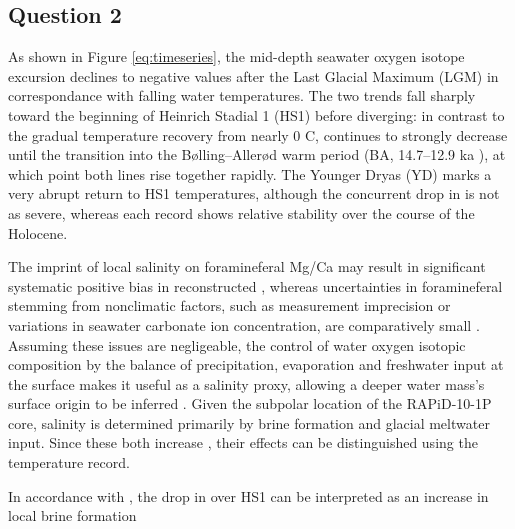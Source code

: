 \subsection{Question 2}
As shown in Figure \ref{eq:timeseries}, the mid-depth seawater oxygen isotope excursion  declines to negative values after the Last Glacial Maximum (LGM) in correspondance with falling water temperatures.
The two trends fall sharply toward the beginning of Heinrich Stadial 1 (HS1) before diverging: in contrast to the gradual temperature recovery from nearly 0 \degree{}C,  continues to strongly decrease until the transition into the Bølling–Allerød warm period (BA, 14.7–12.9 ka \parencite{thornalley2011reconstructing}), at which point both lines rise together rapidly.
The Younger Dryas (YD) marks a very abrupt return to HS1 temperatures, although the concurrent drop in  is not as severe, whereas each record shows relative stability over the course of the Holocene.

The imprint of local salinity on foramineferal Mg/Ca may result in significant systematic positive bias in reconstructed  \parencite{mathien2009salinity}, whereas uncertainties in foramineferal  stemming from nonclimatic factors, such as measurement imprecision or variations in seawater carbonate ion concentration, are comparatively small \parencite{bell2014local}. 
Assuming these issues are negligeable, the control of water oxygen isotopic composition by the balance of precipitation, evaporation and freshwater input at the surface makes it useful as a salinity proxy, allowing a deeper water mass's surface origin to be inferred \parencite{ravelo2007use, lynch2014tracers}.
Given the subpolar location of the RAPiD-10-1P core, salinity is determined primarily by brine formation and glacial meltwater input.
Since these both increase , their effects can be distinguished using the temperature record.

In accordance with \parencite{thornalley2011reconstructing}, the drop in  over HS1 can be interpreted as an increase in local brine formation  




